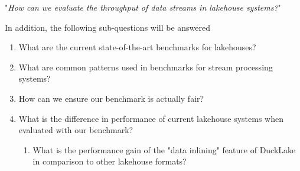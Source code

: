 
\begin{center}
    "\textit{How can we evaluate the throughput of data streams in lakehouse systems?}"
\end{center}


In addition, the following sub-questions will be answered 
\begin{enumerate}
    \item What are the current state-of-the-art benchmarks for lakehouses?
    \item What are common patterns used in benchmarks for stream processing systems?
    \item How can we ensure our benchmark is actually fair?
    \item What is the difference in performance of current lakehouse systems when evaluated with our benchmark?
    \begin{enumerate}
        \item What is the performance gain of the "data inlining" feature of DuckLake in comparison to other lakehouse formats?
    \end{enumerate}
\end{enumerate}

